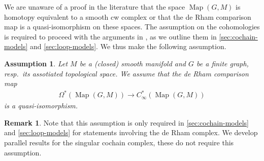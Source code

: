 \documentclass{scrartcl}
\theoremstyle{plain}
\newtheorem{assumption}[theorem]{Assumption}
\theoremstyle{definition}
\newtheorem{remark}[theorem]{Remark}
\DeclareMathOperator{\Map}{Map}
\begin{document}
We are unaware of a proof in the literature that the space $\Map(G, M)$ is homotopy equivalent to a smooth cw complex or that the de Rham comparison map is a quasi-isomorphism on these spaces. The assumption on the cohomologies is required to proceed with the arguments in \cite{naef2019string}, as we outline them in \cref{sec:cochain-models} and \cref{sec:loop-models}. We thus make the following assumption. 

\begin{assumption}\label{assumption}
    Let $M$ be a (closed) smooth manifold and $G$ be a finite graph, resp.~its assotiated topological space. We assume that the de Rham comparison map
    \begin{align*}
        \Omega^*(\Map(G, M)) \to C_\infty^*(\Map(G, M)) 
    \end{align*}
    is a quasi-isomorphism. 
\end{assumption}
\begin{remark}
Note that this assumption is only required in \cref{sec:cochain-models} and \cref{sec:loop-models} for statements involving the de Rham complex. We develop parallel results for the singular cochain complex, these do not require this assumption. 
\end{remark}
\end{document}
